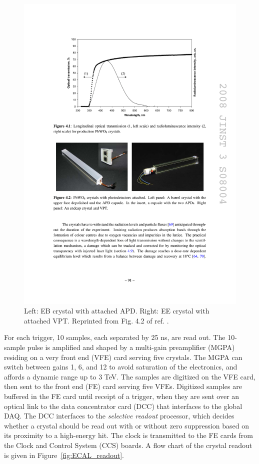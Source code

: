 \documentclass[dissertation.tex]{subfiles}
\begin{document}
\begin{figure}
	\centering
	\includegraphics[scale=1.0]{ECAL_crystals}
	\caption{Left: EB crystal with attached APD.  Right: EE crystal with attached VPT.  Reprinted from Fig. 4.2 of ref. \cite{CMS_detector_paper}.}
	\label{fig:ECAL_crystals}
\end{figure}

For each trigger, 10 samples, each separated by 25 ns, are read out.  The 10-sample pulse is amplified and shaped by a multi-gain preamplifier (MGPA) residing on a very front end (VFE) card serving five crystals.  The MGPA can switch between gains 1, 6, and 12 to avoid saturation of the electronics, and affords a dynamic range up to 3 TeV.  The samples are digitized on the VFE card, then sent to the front end (FE) card serving five VFEs.  Digitized samples are buffered in the FE card until receipt of a trigger, when they are sent over an optical link to the data concentrator card (DCC) that interfaces to the global DAQ.  The DCC interfaces to the \textit{selective readout} processor, which decides whether a crystal should be read out with or without zero suppression based on its proximity to a high-energy hit.  The clock is transmitted to the FE cards from the Clock and Control System (CCS) boards.  A flow chart of the crystal readout is given in Figure~\ref{fig:ECAL_readout}.
\end{document}
